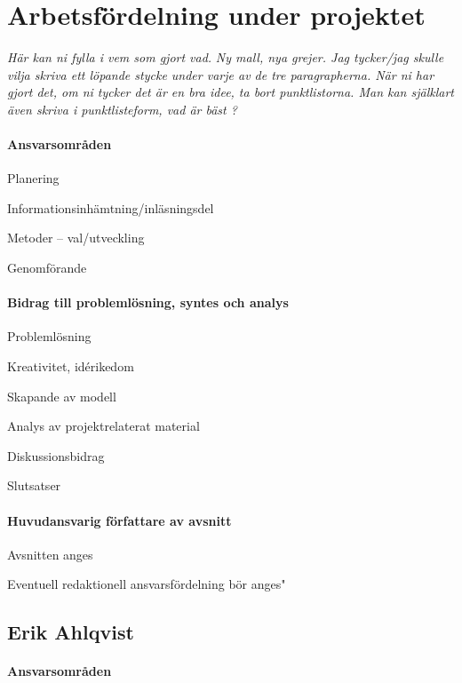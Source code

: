 \documentclass[12pt,a4paper]{article}
\begin{document}

\section*{Arbetsfördelning under projektet}

\emph{\color{red}Här kan ni fylla i vem som gjort vad.}
\emph{\color{red}Ny mall, nya grejer. Jag tycker/jag skulle vilja skriva ett löpande stycke under varje av de tre paragrapherna. När ni har gjort det, om ni tycker det är en bra idee, ta bort punktlistorna. Man kan själklart även skriva i punktlisteform, vad är bäst ?}

\paragraph{Ansvarsområden}

       Planering

       Informationsinhämtning/inläsningsdel

       Metoder -- val/utveckling 

       Genomförande 

\paragraph{Bidrag till problemlösning, syntes och analys}

       Problemlösning 

       Kreativitet, idérikedom

       Skapande av modell

       Analys av projektrelaterat material 

       Diskussionsbidrag

       Slutsatser 

\paragraph{Huvudansvarig författare av avsnitt}

       Avsnitten anges

       Eventuell redaktionell ansvarsfördelning bör anges"

\subsection*{Erik Ahlqvist}

\paragraph{Ansvarsområden}
\end{document}
